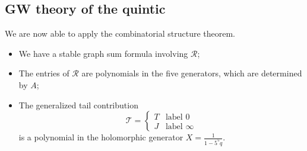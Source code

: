 \documentclass[10pt,oldfontcommands,oneside]{memoir}
\theoremstyle{definition}
\theoremstyle{remark}
\theoremstyle{plain}
\theoremstyle{definition}
\theoremstyle{remark}
\newcommand{\mc}[1]{\mathcal{#1}}
\newcommand{\1}{\mathbf{1}}
\newcommand{\2}{\mathbf{2}}
\newcommand{\3}{\mathbf{3}}
\begin{document}
\subsection{GW theory of the quintic}%
\label{sub:GW theory of the quintic}

We are now able to apply the combinatorial structure theorem.
\begin{itemize}
    \item We have a stable graph sum formula involving $\mc{R}$;
    \item The entries of $\mc{R}$ are polynomials in the five generators, which are determined by $A$;
    \item The generalized tail contribution
        \[ \mc{T} = \begin{cases}
            T & \text{label $0$} \\
            J & \text{label $\infty$}
        \end{cases}\]
        is a polynomial in the holomorphic generator $X = \frac{1}{1-5^5 q}$.
\end{itemize}
\end{document}
